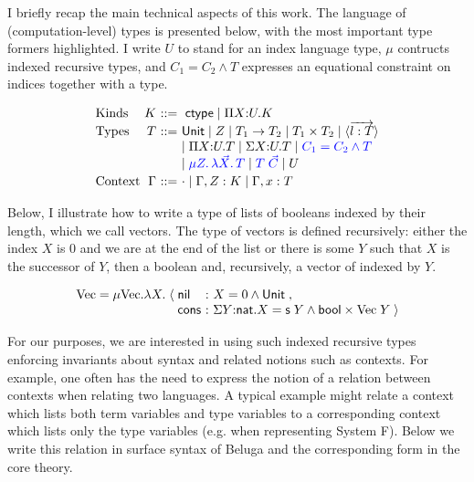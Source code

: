 \documentclass{article}
\begin{document}
I briefly recap the main technical aspects of this work. The
language of (computation-level) types is presented below, with the
most important type formers highlighted. I write $U$ to stand for an index
language type, $\mu$ contructs indexed recursive types, and $C_1 = C_2
\wedge T$ expresses an equational constraint on indices together with
a type.

\[
\begin{array}{l@{~}r@{~}c@{~}l}
%
\mbox{Kinds} & K & \bnfas & \ctype \bnfalt \pibox X U K \\

\mbox{Types} & T  & \bnfas & 
        \m{Unit} 
\bnfalt Z 
\bnfalt T_1 \arrow T_2   
\bnfalt  T_1 \times T_2 
\bnfalt \dsum{\wvec{l : T}} 
\\
& & &   
\bnfalt \pibox X U T 
\bnfalt \sigmabox X U T 
\bnfalt {\color{blue} C_1 = C_2 \andalso T}
\\
&&&    
 \bnfalt {\color{blue} \mu Z.\,\mlam {\vec X}  T}
 \bnfalt {\color{blue} T\;{\vec C} }
\bnfalt U
\\[2pt] %
\mbox{Context} & \Gamma & \bnfas & \cdot \bnfalt \Gamma, Z:K \bnfalt \Gamma, x:T
\end{array}
\]

Below, I illustrate how to write a type of lists of booleans indexed by their
length, which we call vectors. The type of vectors is defined
recursively: either the index $X$ is 0 and we are at the end of the
list or there is some $Y$ such that $X$ is the successor of $Y$, then
a boolean and, recursively, a vector of indexed by $Y$.

\[
\begin{array}{r@{\;}c@{\;}l@{~:~}l}
%
\text{Vec} = \mu \text{Vec}. \lambda X. & \langle & \m{nil} &  X = 0 \andalso \tunit\;, \\
&  & \m{cons} &  \sigmabox Y \nat X = \m{s}\;Y \andalso \m{bool} \times \text{Vec}\;Y  \;\rangle 
\end{array}
\]

For our purposes, we are interested in using such indexed recursive
types enforcing invariants about syntax and related notions such as contexts.
For example, one often has the need to express the notion of a relation
between contexts when relating two languages. A typical example might relate a context
which lists both term variables and type variables to a corresponding
context which lists only the type variables (e.g. when representing
System F). Below we write this relation in surface syntax of Beluga and the
corresponding form in the core theory. 
\end{document}

